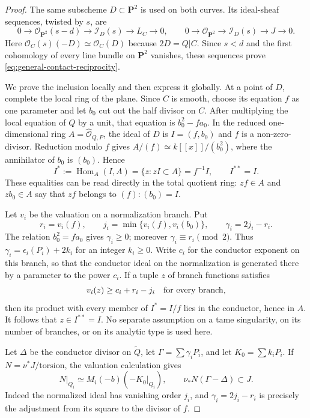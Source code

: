 \begin{proof}
The same subscheme $D\subset\mathbf P^2$ is used on both curves.
Its ideal-sheaf sequences, twisted by $s$, are
\[
 0\to\mathcal O_{\mathbf P^2}(s-d)
  \to\mathcal I_D(s)\to L_C\to0,
 \qquad
 0\to\mathcal O_{\mathbf P^2}
  \to\mathcal I_D(s)\to J\to0.
\]
Here $\mathcal O_C(s)(-D)\simeq\mathcal O_C(D)$ because
$2D=Q|C$.  Since $s<d$ and the first cohomology of every line
bundle on $\mathbf P^2$ vanishes, these sequences prove
\eqref{eq:general-contact-reciprocity}.

We prove the inclusion locally and then express it globally.
At a point of $D$, complete the local ring of the plane.  Since
$C$ is smooth, choose its equation $f$ as one parameter and let
$b_0$ cut out the half divisor on $C$.  After multiplying the local
equation of $Q$ by a unit, that equation is
$b_0^2-fa_0$.  In the reduced one-dimensional ring
$A=\widehat{\mathcal O}_{Q,P}$, the ideal of $D$ is
$I=(f,b_0)$ and $f$ is a non-zero-divisor.
Reduction modulo $f$ gives
$A/(f)\simeq k[[x]]/(b_0^2)$, where the annihilator of $b_0$ is
$(b_0)$.  Hence
\[
 I^*:=\operatorname{Hom}_A(I,A)
 =\{z:zI\subset A\}=f^{-1}I,
 \qquad I^{**}=I.
\]
These equalities can be read directly in the total quotient ring:
$zf\in A$ and $zb_0\in A$ say that $zf$ belongs to
$(f):(b_0)=I$.

Let $v_i$ be the valuation on a normalization branch.  Put
\[
 r_i=v_i(f),\qquad j_i=\min\{v_i(f),v_i(b_0)\},
 \qquad\gamma_i=2j_i-r_i.
\]
The relation $b_0^2=fa_0$ gives $\gamma_i\ge0$; moreover
$\gamma_i\equiv r_i\pmod2$.  Thus
$\gamma_i=\epsilon_i(P_i)+2k_i$ for an integer $k_i\ge0$.
Write $c_i$ for the conductor exponent on this branch, so that
the conductor ideal on the normalization is generated there by
a parameter to the power $c_i$.
If a tuple $z$ of branch functions satisfies
\[
 v_i(z)\ge c_i+r_i-j_i\quad\hbox{for every branch},
\]
then its product with every member of $I^*=I/f$ lies in the
conductor, hence in $A$.  It follows that $z\in I^{**}=I$.
No separate assumption on a tame singularity, on its number of
branches, or on its analytic type is used here.

Let $\Delta$ be the conductor divisor on $\widetilde Q$, let
$\Gamma=\sum\gamma_iP_i$, and let $K_0=\sum k_iP_i$.
If $N=\nu^*J/\text{torsion}$, the valuation calculation gives
\[
 N|_{Q_i}\simeq M_i(-b)(-K_0|_{Q_i}),\qquad
 \nu_*N(\Gamma-\Delta)\subset J.
\]
Indeed the normalized ideal has vanishing order $j_i$, and
$\gamma_i=2j_i-r_i$ is precisely the adjustment from its square
to the divisor of $f$.


\end{proof}
